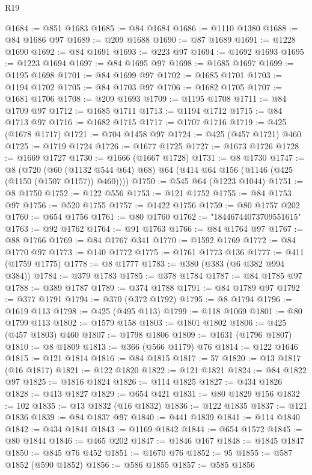 \begin{lexlean}{R19}
\begin{coremodule}
{{{{{{{{{{{{{{{{{{{{{{{{{{{{{{{{{{{{{{{{{{{{{{{{{{{{{{{{{{{{{{{{{{{{{{{{{{{{{{{{{{{{{{{@1684 := @851 @1683
@1685 := @84 @1684
@1686 := @1110 @1380
@1688 := @84 @1686 @97
@1689 := @209 @1688
@1690 := @87 @1689
@1691 := @1228 @1690
@1692 := @84 @1691
@1693 := @223 @97
@1694 := @1692 @1693
@1695 := @1223 @1694
@1697 := @84 @1695 @97
@1698 := @1685 @1697
@1699 := @1195 @1698
@1701 := @84 @1699 @97
@1702 := @1685 @1701
@1703 := @1194 @1702
@1705 := @84 @1703 @97
@1706 := @1682 @1705
@1707 := @1681 @1706
@1708 := @209 @1693
@1709 := @1195 @1708
@1711 := @84 @1709 @97
@1712 := @1685 @1711
@1713 := @1194 @1712
@1715 := @84 @1713 @97
@1716 := @1682 @1715
@1717 := @1707 @1716
@1719 := @425 (@1678 @1717)
@1721 := @704 @1458 @97
@1724 := @425 (@457 @1721) @460
@1725 := @1719 @1724
@1726 := @1677 @1725
@1727 := @1673 @1726
@1728 := @1669 @1727
@1730 := @1666 (@1667 @1728)
@1731 := @8 @1730
@1747 := @8
    (@720 (@60 (@1132 @544 @64) @68) @64 (@414 @64 @156 (@1146 (@425 (@1150 (@1507 @1157)) @460))))
@1750 := @545 @64 (@1223 @1044)
@1751 := @8 @1750
@1752 := @122 @556
@1753 := @121 @1752
@1755 := @84 @1753 @97
@1756 := @520 @1755
@1757 := @1422 @1756
@1759 := @80 @1757 @202
@1760 := @654 @1756
@1761 := @80 @1760
@1762 := "18446744073709551615"
@1763 := @92 @1762
@1764 := @91 @1763
@1766 := @84 @1764 @97
@1767 := @88 @1766
@1769 := @84 @1767 @341
@1770 := @1592 @1769
@1772 := @84 @1770 @97
@1773 := @140 @1772
@1775 := @1761 @1773 @136
@1777 := @411 (@1759 @1775)
@1778 := @8 @1777
@1783 := @380 (@383 (@6 @382 @994 @384))
@1784 := @379 @1783
@1785 := @378 @1784
@1787 := @84 @1785 @97
@1788 := @389 @1787
@1789 := @374 @1788
@1791 := @84 @1789 @97
@1792 := @377 @1791
@1794 := @370 (@372 @1792)
@1795 := @8 @1794
@1796 := @1619 @113
@1798 := @425 (@495 @113)
@1799 := @118 @1069
@1801 := @80 @1799 @113
@1802 := @1579 @158
@1803 := @1801 @1802
@1806 := @425 (@457 @1803) @460
@1807 := @1798 @1806
@1809 := @1631 (@1796 @1807)
@1810 := @8 @1809
@1813 := @366 (@566 @1179) @76
@1814 := @122 @1646
@1815 := @121 @1814
@1816 := @84 @1815
@1817 := 57
@1820 := @13 @1817 (@16 @1817)
@1821 := @122 @1820
@1822 := @121 @1821
@1824 := @84 @1822 @97
@1825 := @1816 @1824
@1826 := @114 @1825
@1827 := @434 @1826
@1828 := @413 @1827
@1829 := @654 @421
@1831 := @80 @1829 @156
@1832 := 102
@1835 := @13 @1832 (@16 @1832)
@1836 := @122 @1835
@1837 := @121 @1836
@1839 := @84 @1837 @97
@1840 := @441 @1839
@1841 := @114 @1840
@1842 := @434 @1841
@1843 := @1169 @1842
@1844 := @654 @1572
@1845 := @80 @1844
@1846 := @465 @202
@1847 := @1846 @167
@1848 := @1845 @1847
@1850 := @845 @76 @452
@1851 := @1670 @76
@1852 := 95
@1855 := @587 @1852 (@590 @1852)
@1856 := @586 @1855
@1857 := @585 @1856
}}}}}}}}}}}}}}}}}}}}}}}}}}}}}}}}}}}}}}}}}}}}}}}}}}}}}}}}}}}}}}}}}}}}}}}}}}}}}}}}}}}}}}}
\end{coremodule}
\end{lexlean}
